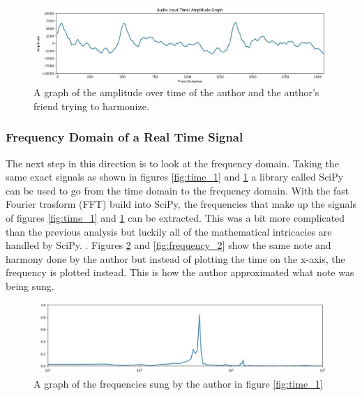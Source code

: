 \documentclass[10pt]{article}
\begin{document}
\begin{figure}[H]
    \centering
    \includegraphics[width=1.05\textwidth]{Matt_1}
    \caption{A graph of the amplitude over time of the author and the author's friend trying to harmonize.}
    \label{fig:time_2}
\end{figure}

\subsubsection{Frequency Domain of a Real Time Signal}
\noindent\hspace{\parindent}The next step in this direction is to look at the frequency domain. Taking the same exact signals as shown in figures \ref{fig:time_1} and \ref{fig:time_2} a library called SciPy can be used to go from the time domain to the frequency domain. With the fast Fourier trasform (FFT) build into SciPy, the frequencies that make up the signals of figures \ref{fig:time_1} and \ref{fig:time_2} can be extracted. This was a bit more complicated than the previous analysis but luckily all of the mathematical intricacies are handled by SciPy.  \cite{scipy}. 
Figures \ref{fig:frequency_1} and \ref{fig:frequency_2} show the same note and harmony done by the author but instead of plotting the time on the x-axis, the frequency is plotted instead. This is how the author approximated what note was being sung.

\begin{figure}[H]
    \centering
    \includegraphics[width=1.05\textwidth]{Alan_1_freq}
    \caption{A graph of the frequencies sung by the author in figure \ref{fig:time_1}}
    \label{fig:frequency_1}
\end{figure}
\end{document}
